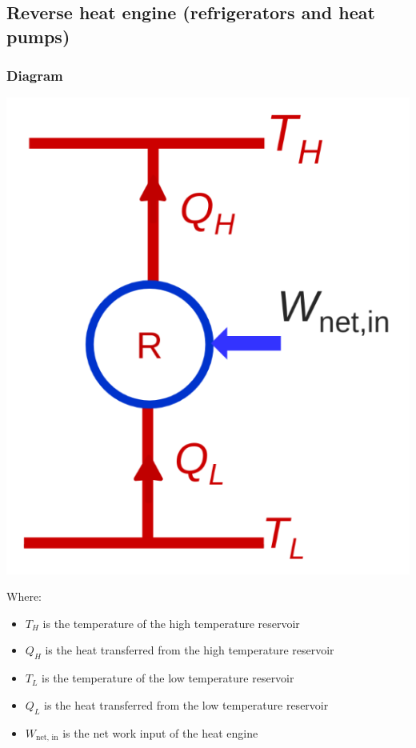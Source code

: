 \documentclass[11pt]{article}
\begin{document}
\subsection{Reverse heat engine (refrigerators and heat pumps)}
\label{sec:org6e524c6}

\subsubsection{Diagram}
\label{sec:org581ad69}
\begin{center}
\includegraphics[scale=1.1]{./images/reverse-heat-engine-diagram.png}
\end{center}

Where:
\begin{itemize}
\item \(T_H\) is the temperature of the high temperature reservoir
\item \(Q_H\) is the heat transferred from the high temperature reservoir
\item \(T_L\) is the temperature of the low temperature reservoir
\item \(Q_L\) is the heat transferred from the low temperature reservoir
\item \(W_{\text{net, in}}\) is the net work input of the heat engine
\end{itemize}
\end{document}

